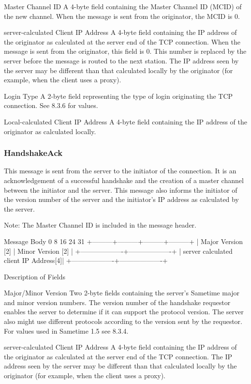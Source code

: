 \documentclass[titlepage,oneside]{book}
\begin{document}
Master Channel ID
  A 4-byte field containing the Master Channel ID (MCID) of the new
  channel. When the message is sent from the originator, the MCID is
  0.

server-calculated Client IP Address
  A 4-byte field containing the IP address of the originator as
  calculated at the server end of the TCP connection. When the message
  is sent from the originator, this field is 0. This number is replaced
  by the server before the message is routed to the next station.
  The IP address seen by the server may be different than that
  calculated locally by the originator (for example, when the client
  uses a proxy).

Login Type
  A 2-byte field representing the type of login originating the TCP
  connection. See 8.3.6 for values.

Local-calculated Client IP Address
  A 4-byte field containing the IP address of the originator as
  calculated locally.

\subsubsection{HandshakeAck}

This message is sent from the server to the initiator of the
connection. It is an acknowledgement of a successful handshake and the
creation of a master channel between the initiator and the server. This
message also informs the initiator of the version number of the server
and the initiator's IP address as calculated by the server.

Note: The Master Channel ID is included in the message header.

Message Body
0         8         16        24      31
+---------+---------+---------+---------+
| Major Version [2] | Minor Version [2] |
+-------------------+-------------------+
| server calculated client IP Address[4]|
+-------------------+-------------------+

Description of Fields

Major/Minor Version
  Two 2-byte fields containing the server's Sametime major and minor
  version numbers. The version number of the handshake requestor
  enables the server to determine if it can support the protocol
  version. The server also might use different protocols according to
  the version sent by the requestor.  For values used in Sametime 1.5
  see 8.3.4.

server-calculated Client IP Address
  A 4-byte field containing the IP address of the originator as
  calculated at the server end of the TCP connection. The IP address
  seen by the server may be different than that calculated locally by
  the originator (for example, when the client uses a proxy).
\end{document}
